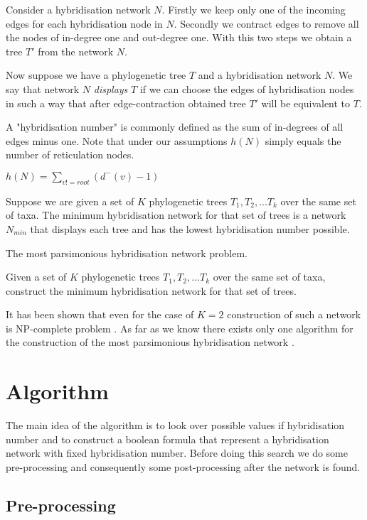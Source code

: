 \documentclass[runningheads, envcountsame, a4paper]{llncs}
\begin{document}
Consider a hybridisation network $N$. Firstly we keep only one of the incoming edges for each hybridisation node in $N$. 
Secondly we contract edges to remove all the nodes of in-degree one and out-degree one. With this two steps we obtain a 
tree $T'$ from the network $N$.

Now suppose we have a phylogenetic tree $T$ and a hybridisation network $N$. We say that network $N$ \emph{displays} $T$ 
if we can choose the edges of hybridisation nodes in such a way that after edge-contraction obtained tree $T'$ will be 
equivalent to $T$.

A "hybridisation number" is commonly defined as the sum of in-degrees of all edges minus one. Note that under our 
assumptions $h(N)$ simply equals the number of reticulation nodes.

$h(N) = \sum\limits_{v != root} (d^-(v) - 1)$

Suppose we are given a set of $K$ phylogenetic trees $T_1, T_2, ... T_k$ over the same set of taxa. The minimum 
hybridisation network for that set of trees is a network $N_{min}$ that displays each tree and has the lowest 
hybridisation number possible.

The most parsimonious hybridisation network problem.

Given a set of $K$ phylogenetic trees $T_1, T_2, ... T_k$ over the same set of taxa, construct the minimum hybridisation 
network for that set of trees.

It has been shown that even for the case of $K=2$ construction of such a network is NP-complete problem 
\cite {bordewich2007computing}. As far as we know there exists only one algorithm for the construction of the most 
parsimonious hybridisation network \cite {wu2013algorithm}.


\section{Algorithm}

The main idea of the algorithm is to look over possible values if hybridisation number and to construct a boolean 
formula that represent a hybridisation network with fixed hybridisation number. Before doing this search we do some 
pre-processing and consequently some post-processing after the network is found.

\subsection{Pre-processing}
\end{document}
